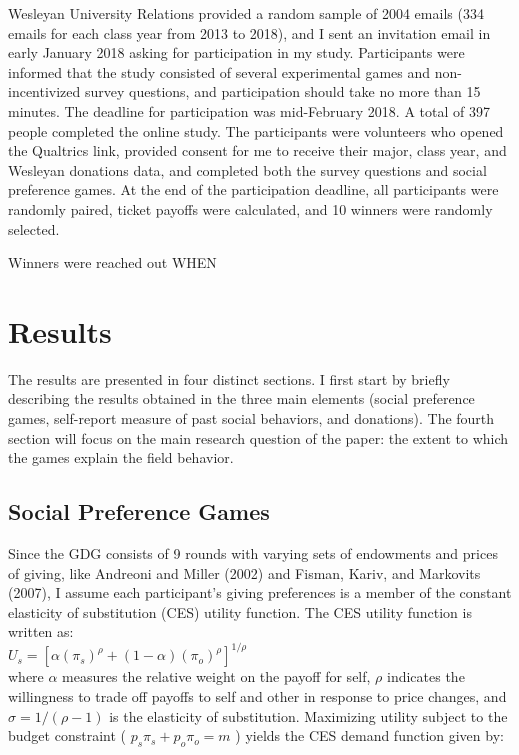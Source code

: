 \documentclass[12pt]{article}
\begin{document}
Wesleyan University Relations provided a random sample of 2004 emails (334 emails for each class year from 2013 to 2018), and I sent an invitation email in early January 2018 asking for participation in my study. Participants were informed that the study consisted of several experimental games and non-incentivized survey questions, and participation should take no more than 15 minutes.  The deadline for participation was mid-February 2018. A total of 397 people completed the online study. The participants were volunteers who opened the Qualtrics link, provided consent for me to receive their major, class year, and Wesleyan donations data, and completed both the survey questions and social preference games. At the end of the participation deadline, all participants were randomly paired, ticket payoffs were calculated, and 10 winners were randomly selected. 

{\color{red} Winners were reached out WHEN}


\section{Results}
The results are presented in four distinct sections. I first start by briefly describing the results obtained in the three main elements (social preference games, self-report measure of past social behaviors, and donations). The fourth section will focus on the main research question of the paper: the extent to which the games explain the field behavior.

\subsection{Social Preference Games}
Since the GDG consists of 9 rounds with varying sets of endowments and prices of giving, like Andreoni and Miller (2002) and Fisman, Kariv, and Markovits (2007), I assume each participant's giving preferences is a member of the constant elasticity of substitution (CES) utility function.  The CES utility function is written as: \\

\(U_{s} = [\alpha(\pi_{s})^{\rho} + (1-\alpha)(\pi_{o})^{\rho}]^{1/\rho} \) \\

\noindent
where \(\alpha\) measures the relative weight on the payoff for self, \(\rho\) indicates the willingness to trade off payoffs to self and other in response to price changes, and \(\sigma = 1/(\rho - 1) \) is the elasticity of substitution. Maximizing utility subject to the budget constraint ( \(p_{s}\pi_{s} + p_{o}\pi_{o}=m\) ) yields the CES demand function given by: \\
 
\end{document}
